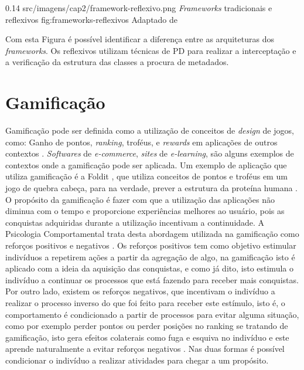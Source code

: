 \begin{image}
{0.14} %
{src/imagens/cap2/framework-reflexivo.png} %
{\textit{Frameworks} tradicionais e reflexivos} %
{fig:frameworks-reflexivos} %
{Adaptado de } %
\end{image}

\par Com esta Figura é possível identificar a diferença entre as arquiteturas dos \textit{frameworks}. Os reflexivos utilizam técnicas de PD para realizar a interceptação e a verificação da estrutura das classes a procura de metadados. 


\section{Gamificação}

\par Gamificação pode ser definida como a utilização de conceitos de \textit{design} de jogos, como: Ganho de pontos, \textit{ranking}, troféus, e \textit{rewards} em aplicações de outros contextos \cite{deterding2011gamification}. \textit{Softwares} de \textit{e-commerce}, \textit{sites} de \textit{e-learning}, são alguns exemplos de contextos onde a gamificação pode ser aplicada. Um exemplo de aplicação que utiliza gamificação é a Foldit \cite{burke2012behind}, que utiliza conceitos de pontos e troféus em um jogo de quebra cabeça, para na verdade, prever a estrutura da proteína humana \cite{deterding2011gamification}. O propósito da gamificação é fazer com que a utilização das aplicações não diminua com o tempo e proporcione experiências melhores ao usuário, pois as conquistas adquiridas durante a utilização incentivam a continuidade. A Psicologia Comportamental trata desta abordagem utilizada na gamificação como reforços positivos e negativos \cite{skinner1990behavior}. Os reforços positivos tem como objetivo estimular indivíduos a repetirem ações a partir da agregação de algo, na gamificação isto é aplicado com a ideia da aquisição das conquistas, e como já dito, isto estimula o indivíduo a continuar os processos que está fazendo para receber mais conquistas. Por outro lado, existem os reforços negativos, que incentivam o indivíduo a realizar o processo inverso do que foi feito para receber este estímulo, isto é, o comportamento é condicionado a partir de processos para evitar alguma situação, como por exemplo perder pontos ou perder posições no ranking se tratando de gamificação, isto gera efeitos colaterais como fuga e esquiva no indivíduo e este aprende naturalmente a evitar reforços negativos \cite{linehan2015gamification}. Nas duas formas é possível condicionar o indivíduo a realizar atividades para chegar a um propósito.

